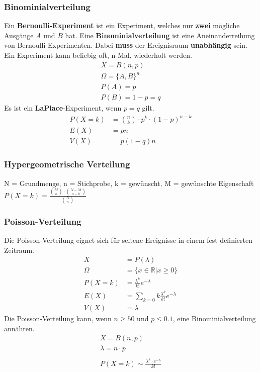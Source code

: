 \documentclass[a4paper, 8pt, landscape]{extarticle}
\let\oldsum\sum
\renewcommand{\sum}{\ensuremath{\textstyle\oldsum}}
\begin{document}
\begin{multicols*}{5}
			\subsubsection{Binominialverteilung}
			    Ein \textbf{Bernoulli-Experiment} ist ein Experiment, welches nur \textbf{zwei} mögliche Ausgänge $A$ und $B$ hat. Eine \textbf{Binominialverteilung} ist eine Aneinanderreihung von Bernoulli-Experimenten. Dabei \textbf{muss} der Ereignisraum \textbf{unabhängig} sein. Ein Experiment kann beliebig oft, n-Mal, wiederholt werden.
				\begin{align*}
					X = B(n, p)\\
					\Omega = \{A, B\}^n\\
					P(A) = p\\
					P(B) = 1 - p = q
				\end{align*}
	    		Es ist ein \textbf{LaPlace}-Experiment, wenn $p = q$ gilt.
			    \begin{align*}
				    P(X = k) &= \binom{n}{k} \cdot p^k \cdot (1-p)^{n-k}\\
				    E(X)&=pn\\
				    V(X)&=p(1-q)n
			    \end{align*}
			\subsubsection{Hypergeometrische Verteilung}
				N = Grundmenge, n = Stichprobe, k = gewünscht, M = gewünschte Eigenschaft\\
					$P(X = k) = \frac{{M \choose k} \cdot {N - M \choose n - k}}{{N \choose n}}$
		    \subsubsection{Poisson-Verteilung}
			    Die Poisson-Verteilung eignet sich für seltene Ereignisse in einem fest definierten Zeitraum.
			    \begin{align*}
				    X &= P(\lambda)\\
				    \Omega &= \{x \in \mathbb{R} | x \geq 0\}\\
				    P(X = k) &= \frac{\lambda^k}{k!} e^{-\lambda}\\
				    E(X)&=\sum_{k=0}k\frac{\lambda^k}{k!}e^{-\lambda}\\
				   	V(X)&=\lambda
			    \end{align*}
			    Die Poisson-Verteilung kann, wenn $n \ge 50$ und $p \leq 0.1$, eine Binominialverteilung annähren.
			    \begin{align*}
				    X = B(n, p) \\
				    \lambda = n \cdot p \\\\
				    P(X = k) \sim \frac{\lambda^k \cdot e^{-\lambda}}{k!}	
			    \end{align*}

\end{multicols*}
\end{document}
